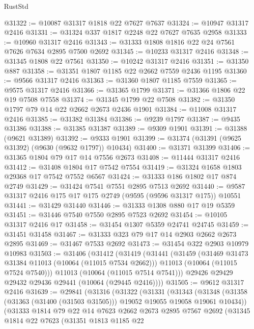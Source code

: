 \begin{lexlean}{RustStd}
\begin{coremodule}
@31322 := @10087 @31317 @1818 @22 @7627 @7637
@31324 := @10947 @31317 @2416
@31331 := @31324 @337 @1817 @2248 @22 @7627 @7635 @2958
@31333 := @10960 @31317 @2416
@31343 := @31333 @1808 @1816 @22 @24 @7561 @7626 @7634 @2895 @7500 @2692
@31345 := @10233 @31317 @2416
@31348 := @31345 @1808 @22 @7561
@31350 := @10242 @31317 @2416
@31351 := @31350 @887
@31358 := @31351 @1807 @1185 @22 @2662 @7559 @2436 @1195
@31360 := @9566 @31317 @2416
@31363 := @31360 @1807 @1185 @7559
@31365 := @9575 @31317 @2416
@31366 := @31365 @1799
@31371 := @31366 @1806 @22 @19 @7508 @7558
@31374 := @31345 @1799 @22 @7508
@31382 := @31350 @1797 @79 @14 @22 @2662 @2673 @2436 @1901
@31384 := @11008 @31317 @2416
@31385 := @31382 @31384
@31386 := @9239 @1797
@31387 := @9435 @31386
@31388 := @31385 @31387
@31389 := @9309 @1901
@31391 := @31388 (@9621 @31389)
@31392 := @9333 @1901
@31399 := @31374 (@31391 (@9625 @31392) (@9630 (@9632 @1797)) @10434)
@31400 := @31371 @31399
@31406 := @31365 @1804 @79 @17 @14 @7556 @2673
@31408 := @11444 @31317 @2416
@31412 := @31408 @1804 @17 @7542 @7554
@31419 := @31324 @1658 @1803 @29368 @17 @7542 @7552 @6567
@31424 := @31333 @186 @1802 @17 @874 @2749
@31429 := @31424 @7541 @7551 @2895 @7513 @2692
@31440 := @9587 @31317 @2416 @175 @17 @175 @2749 (@9595 (@9596 @31317 @175)) @10551
@31441 := @31429 @31440
@31446 := @31333 @1308 @880 @17 @19 @5359
@31451 := @31446 @7540 @7550 @2895 @7523 @2692
@31454 := @10105 @31317 @2416 @17
@31458 := @31454 @1307 @5359 @24741 @24745
@31459 := @31451 @31458
@31467 := @31333 @323 @79 @17 @14 @2903 @2662 @2673 @2895
@31469 := @31467 @7533 @2692
@31473 := @31454 @322 @2903 @10979 @10983
@31503 := @31406
    (@31412
      (@31419
        (@31441
          (@31459
            (@31469 @31473 @31384 @11013 (@10064 (@11015 @7534 @2662)))
            @11013
            (@10064 (@11015 @7524 @7540)))
          @11013
          (@10064 (@11015 @7514 @7541)))
        @29426
        @29429
        @29432
        @29436
        @29441
        (@10064 (@29445 @2416))))
@31505 := @9612 @31317 @2416
@31639 := @29841
    (@31316
      (@31322
        (@31331
          (@31343
            (@31348 (@31358 (@31363 (@31400 (@31503 @31505))) @19052 @19055 @19058 @19061 @10434))
            (@31333
              @1814
              @79
              @22
              @14
              @7623
              @2662
              @2673
              @2895
              @7567
              @2692
              (@31345
                @1814
                @22
                @7623
                (@31351
                  @1813
                  @1185
                  @22

\end{coremodule}
\end{lexlean}

